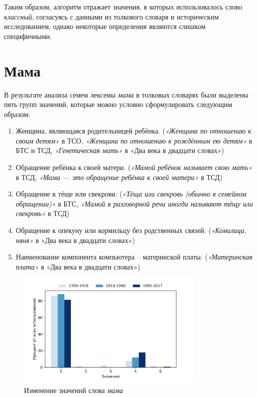 Таким образом, алгоритм отражает значения, в которых использовалось
слово \textit{классный}, согласуясь с данными из толкового словаря и историческим исследованием,
однако некоторые определения являются слишком специфичными.

\section*{Мама}

В результате анализа семем лексемы \textit{мама} в толковых словарях были выделены
пять групп значений, которые можно условно сформулировать следующим образом:

\begin{enumerate}
    \item Женщина, являющаяся родительницей ребёнка.
(\textit{«Женщина по отношению к своим детям»} в ТСО,
\textit{«Женщина по отношению к рождённым ею детям»} в БТС и ТСД,
\textit{«Генетическая мать»} в «Два века в двадцати словах»)

    \item Обращение ребёнка к своей матери.
(\textit{«Мамой ребёнок называет свою мать»} в ТСД,
\textit{«Мама — это обращение ребёнка к своей матери»} в ТСД)

    \item Обращение к тёще или свекрови.
(\textit{«Тёща или свекровь (обычно в семейном обращении)»} в БТС,
\textit{«Мамой в разговорной речи иногда называют тёщу или свекровь»} в ТСД)

    \item Обращение к опекуну или кормильцу без родственных связей.
(\textit{«Комилица, няня»} в «Два века в двадцати словах»)

    \item Наименование компонента компьютера – материнской платы.
(\textit{«Материнская плата»} в «Два века в двадцати словах»)
\end{enumerate}

\begin{figure}[H]
	\centering
	\includegraphics[width=0.8\textwidth]{img/visualizations/mama_minimal}
	\caption{Изменение значений слова \textit{мама}}
	\label{fig:Мама}
\end{figure}

